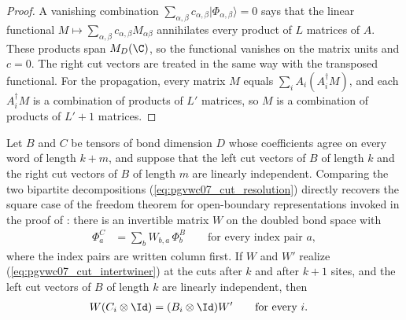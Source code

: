 \begin{proof}
    \leanok
    A vanishing combination $\sum_{\alpha,\beta}c_{\alpha,\beta}
        \lvert\Phi_{\alpha,\beta}\rangle=0$ says that the linear functional
    $M\mapsto\sum_{\alpha,\beta}c_{\alpha,\beta}M_{\alpha\beta}$ annihilates
    every product of $L$ matrices of $A$. These products span $M_D(\C)$, so
    the functional vanishes on the matrix units and $c=0$. The right cut
    vectors are treated in the same way with the transposed functional.
    For the propagation, every matrix $M$ equals
    $\sum_iA_i(A_i^\dagger M)$, and each $A_i^\dagger M$ is a combination of
    products of $L'$ matrices, so $M$ is a combination of products of $L'+1$
    matrices.
\end{proof}

\begin{lemma}
    \label{lem:pgvwc07_cut_intertwiner}
    \leanok
    Let $B$ and $C$ be tensors of bond dimension $D$ whose coefficients agree
    on every word of length $k+m$, and suppose that the left cut vectors of
    $B$ of length $k$ and the right cut vectors of $B$ of length $m$ are
    linearly independent. Comparing the two bipartite decompositions
    (\ref{eq:pgvwc07_cut_resolution}) directly recovers the square case of the freedom theorem for open-boundary
    representations \cite[Theorem~2]{PerezGarcia2007Matrix} invoked in the
    proof of \cite[Theorem~7]{PerezGarcia2007Matrix}: there is an invertible matrix $W$ on the
    doubled bond space with
    \begin{align}
        \Phi^{C}_{a}
         & =\sum_{b}W_{b,a}\,\Phi^{B}_{b}
        \qquad\text{for every index pair }a,
        \label{eq:pgvwc07_cut_intertwiner}
    \end{align}
    where the index pairs are written column first. If $W$ and $W'$ realize
    (\ref{eq:pgvwc07_cut_intertwiner}) at the cuts after $k$ and after $k+1$
    sites, and the left cut vectors of $B$ of length $k$ are linearly
    independent, then
    \begin{align}
        W(C_i\otimes\Id) & =(B_i\otimes\Id)W' \qquad\text{for every }i.
        \label{eq:pgvwc07_cut_chain_relation}
    \end{align}
\end{lemma}

